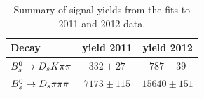 \begin{table}[h]
\centering
\begin{tabular}{l c c}
Decay & yield 2011 & yield 2012\\
\hline
${{B}^0_{s}}\rightarrow{\ensuremath{{D}_{s}}}{\ensuremath{K}}{\ensuremath{\pi}}{\ensuremath{\pi}}$ &  $332 \pm  27$   &  $787 \pm 39$\\
${{B}^0_{s}}\rightarrow{\ensuremath{{D}_{s}}}{\ensuremath{\pi}}{\ensuremath{\pi}}{\ensuremath{\pi}}$ &  $7173 \pm 115$  &  $15640 \pm 151$\\
\hline
\end{tabular}
\caption{Summary of signal yields from the fits to 2011 and 2012 data.}
\label{tab: SigYields}
\end{table}


